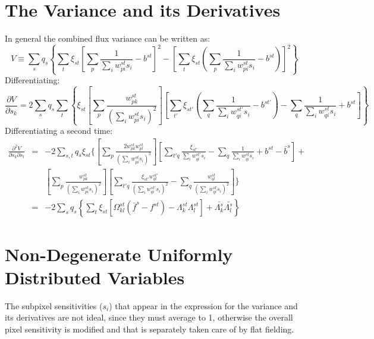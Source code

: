 \documentclass{article}
\begin{document}
\section{The Variance and its Derivatives}
In general the combined flux variance can be written as:
\begin{displaymath}
	V\equiv
	\sum_s q_s \left\{
	\sum_t \xi_{st} \left[ \sum_p \frac{1}{\sum_iw_{pi}^{st}s_i}-b^{st}
	\right]^2 -
	\left[\sum_t\xi_{st}\left(
	\sum_p\frac{1}{\sum_i w_{pi}^{st}s_i}-b^{st}\right)\right]^2
	\right\}
\end{displaymath}
Differentiating:
\begin{displaymath}
	\frac{\partial V}{\partial s_k}=2\sum_s q_s \sum_t \left\{
	\xi_{st}\left[
		\sum_p\frac{w_{pk}^{st}}{\left(\sum_i
		w_{pi}^{st}s_i\right)^2}
	\right] \left[
		\sum_{t'} \xi_{st'} \left(
			\sum_q \frac{1}{\sum_i w_{qi}^{st'} s_i} - b^{st'}
		\right)
		-\sum_q \frac{1}{\sum_i w_{qi}^{st} s_i} + b^{st}
	\right] \right\}
\end{displaymath}
Differentiating a second time:
\begin{eqnarray*}
	\frac{\partial^2 V}{\partial s_k\partial s_l} &=& -2\sum_{s,t} q_s
	\xi_{st} \Bigg\{
	\left[
		\sum_p \frac{2w_{pk}^{st}w_{pl}^{st}}{\left(\sum_i
		w_{pi}^{st} s_i\right)^3}
	\right] \left[
		\sum_{t'q} \frac{\xi_{st'}}{\sum_i w_{qi}^{st'}s_i} -
		\sum_q \frac{1}{\sum_i w_{qi}^{st} s_i} + b^{st} - \bar{b}^s
	\right]+\\
	&&
	\left[
		\sum_p \frac{w_{pk}^{st}}{\left(\sum_i w_{pi}^{st} s_i\right)^2}
	\right] \left[
		\sum_{t'q} \frac{\xi_{st'} w_{ql}^{st'}}{
		\left(\sum_iw_{qi}^{st'} s_i\right)^2} -
		\sum_q \frac{w_{ql}^{st}}{
		\left(\sum_i w_{qi}^{st}s_i\right)^2}
	\right]
	\Bigg\}\\
	&=& -2\sum_s q_s \left\{ \sum_t \xi_{st} \left[
		\Omega_{kl}^{st} \left(\bar{f}^s - f^{st}\right)
		-\Lambda_k^{st}\Lambda_l^{st}
	\right] + \bar{\Lambda_k^s}\bar{\Lambda_l^s} \right\}
\end{eqnarray*}

\section{Non-Degenerate Uniformly Distributed Variables}

The subpixel sensitivities ($s_i$) that appear in the expression for the
variance and its derivatives are not ideal, since they must average to 1,
otherwise the overall pixel sensitivity is modified and that is separately
taken care of by flat fielding. 
\end{document}
